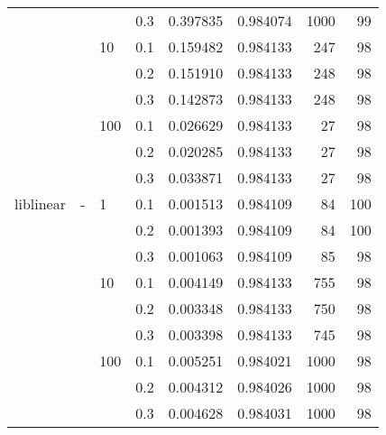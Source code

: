 \begin{table}[H]
\begin{tabular}{llllrrrr}
          &   &     & 0.3 &  0.397835 &  0.984074 &    1000 &    99 \\
          &   & 10  & 0.1 &  0.159482 &  0.984133 &     247 &    98 \\
          &   &     & 0.2 &  0.151910 &  0.984133 &     248 &    98 \\
          &   &     & 0.3 &  0.142873 &  0.984133 &     248 &    98 \\
          &   & 100 & 0.1 &  0.026629 &  0.984133 &      27 &    98 \\
          &   &     & 0.2 &  0.020285 &  0.984133 &      27 &    98 \\
          &   &     & 0.3 &  0.033871 &  0.984133 &      27 &    98 \\
liblinear & - & 1   & 0.1 &  0.001513 &  0.984109 &      84 &   100 \\
          &   &     & 0.2 &  0.001393 &  0.984109 &      84 &   100 \\
          &   &     & 0.3 &  0.001063 &  0.984109 &      85 &    98 \\
          &   & 10  & 0.1 &  0.004149 &  0.984133 &     755 &    98 \\
          &   &     & 0.2 &  0.003348 &  0.984133 &     750 &    98 \\
          &   &     & 0.3 &  0.003398 &  0.984133 &     745 &    98 \\
          &   & 100 & 0.1 &  0.005251 &  0.984021 &    1000 &    98 \\
          &   &     & 0.2 &  0.004312 &  0.984026 &    1000 &    98 \\
          &   &     & 0.3 &  0.004628 &  0.984031 &    1000 &    98 \\
\bottomrule
\end{tabular}
\end{table}
